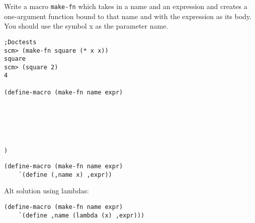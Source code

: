\begin{blocksection}

\question Write a macro \texttt{make-fn} which takes in a name and an expression and creates
a one-argument function bound to that name and with the expression as its body. You should use
the symbol x as the parameter name.

\begin{lstlisting}
;Doctests
scm> (make-fn square (* x x))
square
scm> (square 2)
4

(define-macro (make-fn name expr)






)

\end{lstlisting}
\end{blocksection}
\begin{blocksection}
\begin{solution}[0.5in]
\begin{lstlisting}
(define-macro (make-fn name expr)
    `(define (,name x) ,expr))
\end{lstlisting}
Alt solution using lambdas:
\begin{lstlisting}
(define-macro (make-fn name expr)
    `(define ,name (lambda (x) ,expr)))
\end{lstlisting}
\end{solution}

\end{blocksection}
